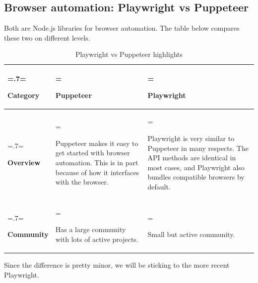 \subsection{Browser automation: Playwright vs Puppeteer}
Both are Node.js libraries for browser automation. The table below compares these two on different levels.
\begin{table}[H]
	\renewcommand{\arraystretch}{1.5}%
	\caption{Playwright vs Puppeteer highlights}
	\centering
	\medskip
	\begin{tabularx}{1\textwidth} {
			| >{\hsize=.7\hsize\linewidth=\hsize\raggedright\arraybackslash}X
			| >{\hsize=1.15\hsize\linewidth=\hsize\raggedright\arraybackslash}X
			| >{\hsize=1.15\hsize\linewidth=\hsize\raggedright\arraybackslash}X |}
		\hline
		\rowcolor{primary} \textbf {Category} & \textbf {Puppeteer}                                                                                                            & \textbf {Playwright}                                                                                                                                               \\
		\hline
		\textbf {Overview}                    & Puppeteer makes it easy to get started with browser automation. This is in part because of how it interfaces with the browser. & Playwright is very similar to Puppeteer in many respects. The API methods are identical in most cases, and Playwright also bundles compatible browsers by default. \\
		\hline
		\textbf {Community}                   & Has a large community with lots of active projects.                                                                            & Small but active community.                                                                                                                                        \\
		\hline
	\end{tabularx}
\end{table}
Since the difference is pretty minor, we will be sticking to the more recent Playwright.
